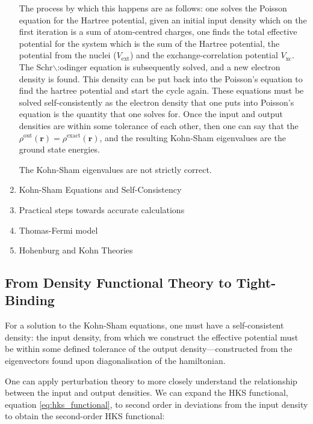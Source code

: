 \documentclass[a4paper,12pt,oneside,print,numbered,index,PageStyleIII]{PhDThesisPSnPDF}
\begin{document}
\begin{enumerate}
The process by which this happens are as follows: one solves the Poisson
equation for the Hartree potential, given an initial input density which on
the first iteration is a sum of atom-centred charges, one finds the total
effective potential for the system which is the sum of the Hartree potential,
the potential from the nuclei (\(V_{\text{ext}}\)) and the exchange-correlation
potential \(V_{\text{xc}}\). The Schr$\backslash$:odinger equation is subsequently solved,
and a new electron density is found. This density can be put back into the
Poisson's equation to find the hartree potential and start the cycle
again. These equations must be solved self-consistently as the electron
density that one puts into Poisson's equation is the quantity that one solves
for. Once the input and output densities are within some tolerance of each
other, then one can say that the \(\rho^{\text{out}}(\mathbf{r}) =
 \rho^{\text{exact}}(\mathbf{r})\), and the resulting Kohn-Sham eigenvalues are
the ground state energies.

The Kohn-Sham eigenvalues are not strictly correct.


\item Kohn-Sham Equations and Self-Consistency
\label{sec:orgdc10676}


\item Practical steps towards accurate calculations
\label{sec:orgf5106d6}



\item Thomas-Fermi model
\label{sec:org676352a}

\item Hohenburg and Kohn Theories
\label{sec:org59e1043}
\end{enumerate}




\subsection{From Density Functional Theory to Tight-Binding}
\label{sec:org6f9dd12}

For a solution to the Kohn-Sham equations, one must have a self-consistent
density: the input density, from which we construct the effective potential
must be within some defined tolerance of the output density---constructed
from the eigenvectors found upon diagonalisation of the hamiltonian.

One can apply perturbation theory to more closely understand the relationship
between the input and output densities. We can expand the HKS functional,
equation \eqref{eq:hks_functional}, to second order in deviations from the
input density to obtain the second-order HKS functional:
\end{document}
